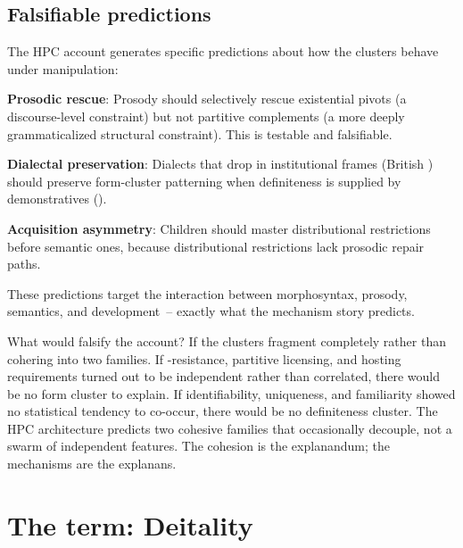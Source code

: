 \subsection{Falsifiable predictions}
\label{sec:10:predictions}

The HPC account generates specific predictions about how the clusters behave under manipulation:

\textbf{Prosodic rescue}: Prosody should selectively rescue existential pivots (a discourse-level constraint) but not partitive complements (a more deeply grammaticalized structural constraint). This is testable and falsifiable.

\textbf{Dialectal preservation}: Dialects that drop  in institutional frames (British ) should preserve form-cluster patterning when definiteness is supplied by demonstratives ().

\textbf{Acquisition asymmetry}: Children should master distributional restrictions before semantic ones, because distributional restrictions lack prosodic repair paths.

These predictions target the interaction between morphosyntax, prosody, semantics, and development~-- exactly what the mechanism story predicts.

What would falsify the account? If the clusters fragment completely rather than cohering into two families. If -resistance, partitive licensing, and hosting requirements turned out to be independent rather than correlated, there would be no form cluster to explain. If identifiability, uniqueness, and familiarity showed no statistical tendency to co-occur, there would be no definiteness cluster. The HPC architecture predicts two cohesive families that occasionally decouple, not a swarm of independent features. The cohesion is the explanandum; the mechanisms are the explanans.

\section{The term: Deitality}
\label{sec:10:deitality}

